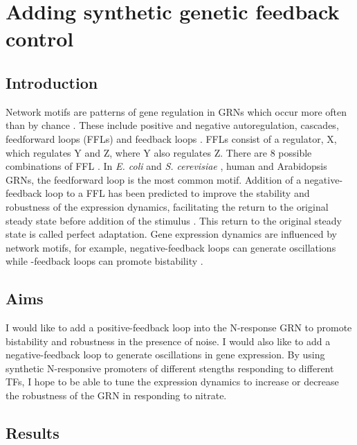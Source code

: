 \documentclass[../main.tex]{subfiles}
\begin{document}
\chapter{Adding synthetic genetic feedback control}\label{chapter6}
\section{Introduction}\label{chapter6:introduction}
Network motifs are patterns of gene regulation in GRNs which occur more often than by chance \autocite{miloNetworkMotifsSimple2002}.
These include positive and negative autoregulation, cascades, feedforward loops (FFLs) and feedback loops \autocite{shovalSnapShotNetworkMotifs2010}.
FFLs consist of a regulator, X, which regulates Y and Z, where Y also regulates Z.
There are 8 possible combinations of FFL \autocite{shovalSnapShotNetworkMotifs2010}.
In \textit{E. coli} \autocite{shen-orrNetworkMotifsTranscriptional2002} and \textit{S. cerevisiae} \autocite{leeTranscriptionalRegulatoryNetworks2002}, human \autocite{boyerCoreTranscriptionalRegulatory2005} and Arabidopsis \autocite{chenArchitectureGeneRegulatory2018} GRNs, the feedforward loop is the most common motif.
Addition of a negative-feedback loop to a FFL has been predicted to improve the stability and robustness of the expression dynamics, facilitating the return to the original steady state before addition of the stimulus \autocite{reevesEngineeringPrinciplesCombining2019}.
This return to the original steady state is called perfect adaptation.
Gene expression dynamics are influenced by network motifs, for example, negative\hyp{}feedback loops can generate oscillations while \hyp{}feedback loops can promote bistability \autocite{shovalSnapShotNetworkMotifs2010}.
\section{Aims}\label{chapter6:aims}
I would like to add a positive\hyp{}feedback loop into the N-response GRN to promote bistability and robustness in the presence of noise. I would also like to add a negative\hyp{}feedback loop to generate oscillations in gene expression.
By using synthetic N-responsive promoters of different stengths responding to different TFs, I hope to be able to tune the expression dynamics to increase or decrease the robustness of the GRN in responding to nitrate.
\section{Results}\label{chapter6:results}
\end{document}
